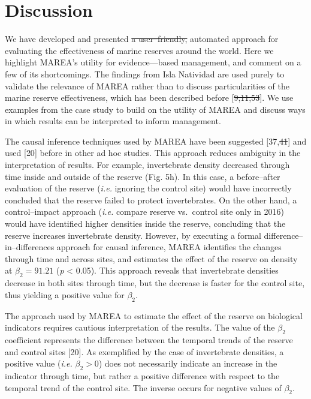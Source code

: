 \documentclass[12pt,]{article}
\providecommand{\DIFaddtex}[1]{{\protect\color{blue}\uwave{#1}}} %
\providecommand{\DIFdeltex}[1]{{\protect\color{red}\sout{#1}}}                      %
\providecommand{\DIFaddbegin}{} %
\providecommand{\DIFaddend}{} %
\providecommand{\DIFdelbegin}{} %
\providecommand{\DIFdelend}{} %
\providecommand{\DIFadd}[1]{\texorpdfstring{\DIFaddtex{#1}}{#1}} %
\providecommand{\DIFdel}[1]{\texorpdfstring{\DIFdeltex{#1}}{}} %
\newcommand{\DIFscaledelfig}{0.5}
\newlength{\DIFdelgraphicswidth} %
\newlength{\DIFdelgraphicsheight} %
\newcommand{\DIFaddincludegraphics}[2][]{{\color{blue}\fbox{\DIFOincludegraphics[#1]{#2}}}} %
\newcommand{\DIFdelincludegraphics}[2][]{%
\sbox{\DIFdelgraphicsbox}{\DIFOincludegraphics[#1]{#2}}%
\settoboxwidth{\DIFdelgraphicswidth}{\DIFdelgraphicsbox} %
\settoboxtotalheight{\DIFdelgraphicsheight}{\DIFdelgraphicsbox} %
\scalebox{\DIFscaledelfig}{%
\parbox[b]{\DIFdelgraphicswidth}{\usebox{\DIFdelgraphicsbox}\\[-\baselineskip] \rule{\DIFdelgraphicswidth}{0em}}\llap{\resizebox{\DIFdelgraphicswidth}{\DIFdelgraphicsheight}{%
\setlength{\unitlength}{\DIFdelgraphicswidth}%
\begin{picture}(1,1)%
\thicklines\linethickness{2pt} %
{\color[rgb]{1,0,0}\put(0,0){\framebox(1,1){}}}%
{\color[rgb]{1,0,0}\put(0,0){\line( 1,1){1}}}%
{\color[rgb]{1,0,0}\put(0,1){\line(1,-1){1}}}%
\end{picture}%
}\hspace*{3pt}}} %
} %
\DeclareRobustCommand{\DIFaddbegin}{\DIFOaddbegin \let\includegraphics\DIFaddincludegraphics} %
\DeclareRobustCommand{\DIFaddend}{\DIFOaddend \let\includegraphics\DIFOincludegraphics} %
\DeclareRobustCommand{\DIFdelbegin}{\DIFOdelbegin \let\includegraphics\DIFdelincludegraphics} %
\DeclareRobustCommand{\DIFdelend}{\DIFOaddend \let\includegraphics\DIFOincludegraphics} %
\begin{document}
\clearpage

\section{Discussion}\label{discussion}

We have developed and presented \DIFdelbegin \DIFdel{a user--friendly, }\DIFdelend \DIFaddbegin \DIFadd{an }\DIFaddend automated approach for evaluating the
effectiveness of marine reserves \DIFaddbegin \DIFadd{in Mexico, and perhaps }\DIFaddend around the
world. Here we highlight MAREA's utility for evidence---based
management, and comment on a few of its shortcomings. The findings from
Isla Natividad are used purely to validate the relevance of MAREA rather
than to discuss particularities of the marine reserve effectiveness,
which has been described before {[}\DIFdelbegin \DIFdel{9,11,53}\DIFdelend \DIFaddbegin \DIFadd{8,10,42}\DIFaddend {]}. We use examples from the
case study to build on the utility of MAREA and discuss ways in which
results can be interpreted to inform management.

The causal inference techniques used by MAREA have been suggested
{[}37,\DIFdelbegin \DIFdel{41}\DIFdelend \DIFaddbegin \DIFadd{46}\DIFaddend {]} and used {[}20{]} before in other ad hoc studies. This
approach reduces ambiguity in the interpretation of results. For
example, invertebrate density decreased through time inside and outside
of the reserve (Fig. 5h). In this case, a before--after evaluation of
the reserve (\emph{i.e.} ignoring the control site) would have
incorrectly concluded that the reserve failed to protect invertebrates.
On the other hand, a control--impact approach (\emph{i.e.} compare
reserve vs.~control site only in 2016) would have identified higher
densities inside the reserve, concluding that the reserve increases
invertebrate density. However, by executing a formal
difference--in--differences approach for causal inference, MAREA
identifies the changes through time and across sites, and estimates the
effect of the reserve on density at \(\beta_2 = 91.21\) (\emph{p}
\textless{} 0.05). This approach reveals that invertebrate densities
decrease in both sites through time, but the decrease is faster for the
control site, thus yielding a positive value for \(\beta_2\).

The approach used by MAREA to estimate the effect of the reserve on
biological indicators requires cautious interpretation of the results.
The value of the \(\beta_2\) coefficient represents the difference
between the temporal trends of the reserve and control sites {[}20{]}.
As exemplified by the case of invertebrate densities, a positive value
(\emph{i.e.} \(\beta_2 > 0\)) does not necessarily indicate an increase
in the indicator through time, but rather a positive difference with
respect to the temporal trend of the control site. The inverse occurs
for negative values of \(\beta_2\).
\end{document}
